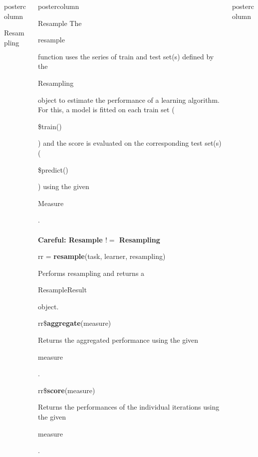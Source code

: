 \documentclass{beamer}
\newlength{\columnheight} %
\newcommand{\codeinline}[1]{\begin{codeboxinline}#1\end{codeboxinline}}
\begin{document}
\begin{withoutheader}
\begin{frame}[fragile]{}
\begin{columns}
\begin{column}{.245\textwidth}
\begin{beamercolorbox}[center]{postercolumn}
\begin{minipage}{.98\textwidth}
{\begin{myblock}{Resampling}
						\end{myblock}
						\vfill
					}
				\end{minipage}
			\end{beamercolorbox}
		\end{column}
		\begin{column}{.245\textwidth}
			\begin{beamercolorbox}[center]{postercolumn}
				\begin{minipage}{.98\textwidth}
					\parbox[t][\columnheight]{\textwidth}{
						\begin{myblock}{Resample}
							The \codeinline{resample} function uses the series
							of train and test set(s) defined by the
							\codeinline{Resampling} object to estimate the
							performance of a learning algorithm. For this, a
							model is fitted on each train set
							(\codeinline{\$train()}) and the score is evaluated
							on the corresponding test set(s)
							(\codeinline{\$predict()}) using the given
							\codeinline{Measure}.
							\\
							\\
							\textbf{Careful: Resample $!=$ Resampling}
							\vspace{1em}
							\\
							\begin{codebox}
								rr = \textbf{resample}(task, learner, resampling)
							\end{codebox}
							Performs resampling and returns a \codeinline{ResampleResult} object.
							\\
							\vspace{1em}
							\begin{codebox}
								rr\$\textbf{aggregate}(measure)
							\end{codebox}
							Returns the aggregated performance using the given \codeinline{measure}.
							\\
							\begin{codebox}
								rr\$\textbf{score}(measure)
							\end{codebox}
							Returns the performances of the individual iterations using the given \codeinline{measure}.
						\end{myblock}
						\vfill
					}
				\end{minipage}
			\end{beamercolorbox}
		\end{column}
		\begin{column}{.245\textwidth}
			\begin{beamercolorbox}[center]{postercolumn}

\end{beamercolorbox}
\end{column}
\end{columns}
\end{frame}
\end{withoutheader}
\end{document}
